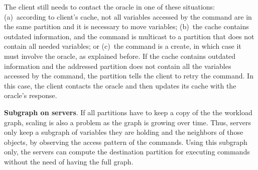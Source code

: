 The client still needs to contact the oracle in one of these situations:
(a)~according to client's cache, not all variables accessed by the command are in the same partition and it is necessary to move variables;
(b)~the cache contains outdated information, and the command is multicast to a partition that does not contain all needed variables; or
(c)~the command is a create, in which case it must involve the oracle, as explained before.
If the cache contains outdated information and the addressed partition does not contain all the variables accessed by the command, the partition tells the client to retry the command.
In this case, the client contacts the oracle and then updates its cache with the oracle's response.

\textbf{Subgraph on servers}. If all partitions have to keep a copy of the the workload graph, scaling is also a problem as the graph is growing over time. Thus, servers only keep a subgraph of variables they are holding and the neighbors of those objects, by observing the access pattern of the commands. Using this subgraph only, the servers can compute the destination partition for executing commands without the need of having the full graph.






